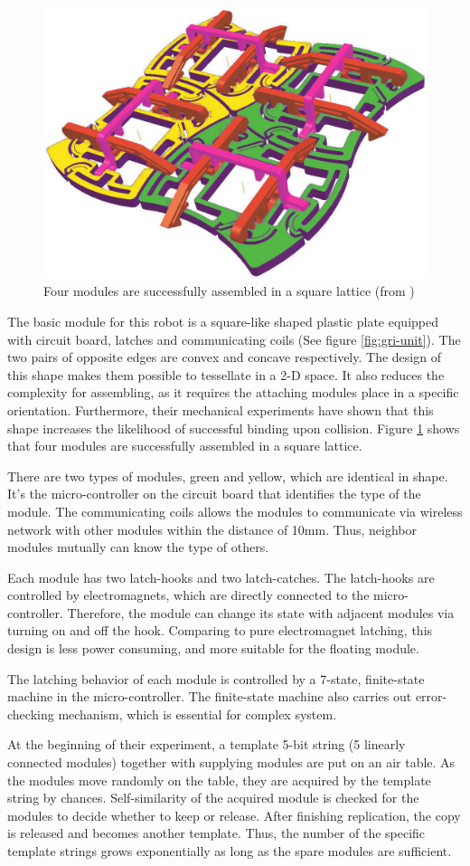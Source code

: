 \documentclass[12pt,twoside]{article}
\theoremstyle{plain}
\theoremstyle{definition}
\theoremstyle{remark}
\begin{document}
\begin{figure}[t]
	 \centerline{\includegraphics[width=.4\textwidth]{griffith-001}}
	 {\caption{Four modules are successfully assembled in a square lattice (from \cite{griffith_growing_2004})}
	 \label{fig:gri-sqr}}
\end{figure}

The basic module for this robot is a square-like shaped plastic plate equipped with circuit board, latches and communicating coils (See figure \ref{fig:gri-unit}). The two pairs of opposite edges are convex and concave respectively. The design of this shape makes them possible to tessellate in a 2-D space. It also reduces the complexity for assembling, as it requires the attaching modules place in a specific orientation. Furthermore, their mechanical experiments have shown that this shape increases the likelihood of successful binding upon collision. Figure \ref{fig:gri-sqr} shows that four modules are successfully assembled in a square lattice. 

There are two types of modules, green and yellow, which are identical in shape. It's the micro-controller on the circuit board that identifies the type of the module. The communicating coils allows the modules to communicate via wireless network with other modules within the distance of 10mm. Thus, neighbor modules mutually can know the type of others. 

Each module has two latch-hooks and two latch-catches. The latch-hooks are controlled by electromagnets, which are directly connected to the micro-controller. Therefore, the module can change its state with adjacent modules via turning on and off the hook. Comparing to pure electromagnet latching, this design is less power consuming, and more suitable for the floating module. 

The latching behavior of each module is controlled by a 7-state, finite-state machine in the micro-controller. The finite-state machine also carries out error-checking mechanism, which is essential for complex system.

At the beginning of their experiment, a template 5-bit string (5 linearly connected modules) together with supplying modules are put on an air table. As the modules move randomly on the table, they are acquired by the template string by chances. Self-similarity of the acquired module is checked for the modules to decide whether to keep or release. After finishing replication, the copy is released and becomes another template. Thus, the number of the specific template strings grows exponentially as long as the spare modules are sufficient.
\end{document}
